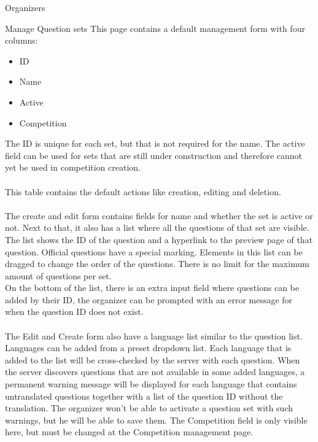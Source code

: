 \begin{section}{Organizers}
	\begin{subsection}{Manage Question sets}
		This page contains a default management form with four columns:
		\begin{itemize}
			\item ID
			\item Name
			\item Active
			\item Competition
		\end{itemize}
		The ID is unique for each set, but that is not required for the name. The active
		field can be used for sets that are still under construction and therefore cannot
		yet be used in competition creation.\\
		\\
		This table contains the default actions like creation, editing and deletion. \\
		\\
		The create and edit form contains fields for name and whether the set is active or
		not. Next to that, it also has a list where all the questions of that set are
		visible. The list shows the ID of the question and a hyperlink to the preview
		page of that question. Official questions have a special marking. Elements in this
		list can be dragged to change the order of the questions. There is no limit for 
		the maximum amount of questions per set. \\
		On the bottom of the list, there is an extra input field where questions can be
		added by their ID, the organizer can be prompted with an error message for when
		the question ID does not exist. \\
		\\
		The Edit and Create form also have a language list similar to the question list.
		Languages can be added from a preset dropdown list. Each language that is added
		to the list will be cross-checked by the server with each question. When the
		server discovers questions that are not available in some added languages, a
		permanent warning message will be displayed for each language that contains
		untranslated questions together with a list of the question ID without the
		translation. The organizer won't be able to activate a question set with such
		warnings, but he will be able to save them. The Competition field is only visible
		here, but must be changed at the Competition management page.
		
	\end{subsection}
	

\end{section}
